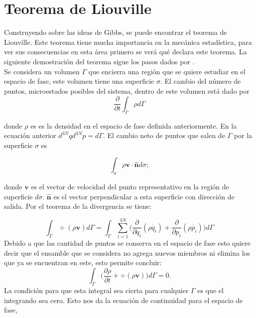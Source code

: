 \section{Teorema de Liouville }
Construyendo sobre las ideas de Gibbs, se puede encontrar el teorema de Liouville. Este teorema tiene mucha importancia en la mecánica estadística, para ver sus consecuencias en esta área primero se verá qué declara este teorema. La siguiente demostración del teorema sigue los pasos dados por \cite{PathriaStat}. 
\\
Se considera un volumen $\Gamma$ que encierra una región que se quiere estudiar en el espacio de fase,  este volumen tiene una superficie $\sigma$. El cambio del número de puntos, microestados posibles del sistema, dentro de este volumen está dado por 
\begin{equation}
\frac{\partial}{\partial t} \int_{\Gamma} \rho d\Gamma
\end{equation}

donde $\rho$ es es la densidad en el espacio de fase definida anteriormente. En la ecuación anterior $d^{3N}q d^{3N}p=d\Gamma$. 
El cambio neto de puntos que salen de $\Gamma$ por la superficie $\sigma$ es

\begin{equation}
\int_{\sigma} \rho \mathbf{v \cdot \hat{n}} d\sigma;
\end{equation}

donde $\mathbf{v}$ es el vector de velocidad del punto representativo en la región de superficie $d\sigma$. $\mathbf{\hat{n}}$ es el vector perpendicular a esta superficie con dirección de salida. Por el teorema de la divergencia se tiene:

\begin{equation}
\int_{\Gamma} \div{ ( \rho\mathbf{v} ) } d\Gamma = \int_{\Gamma} \sum_{i=1}^{3N} \Big( \frac{\partial}{\partial q_{i}}(\rho \dot{q_{i}})+ \frac{\partial}{\partial p_{i}} (\rho \dot{p_{i}}) \Big) d\Gamma
\end{equation}
Debido a que las cantidad de puntos se conserva en el espacio de fase esto quiere decir que el ensamble que se considera no agrega nuevos miembros ni elimina los que ya se encuentran en este, esto permite concluir:
\begin{equation}
 \int_{\Gamma} \Big( \frac{\partial \rho}{\partial t} + \div{ ( \rho\mathbf{v} ) } \Big) d\Gamma =0.
\end{equation}
La condición para que esta integral sea cierta para cualquier $\Gamma$ es que el integrando sea cero. Esto nos da la ecuación de continuidad para el espacio de fase,

